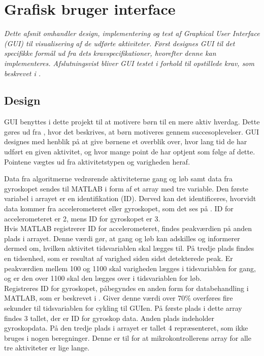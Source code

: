 \section{Grafisk bruger interface}\label{GUI_design}
\textit{Dette afsnit omhandler design, implementering og test af Graphical User Interface (GUI) til visualisering af de udførte aktiviteter. Først designes GUI til det specifikke formål ud fra dets kravspecifikationer, hvorefter denne kan implementeres. Afslutningsvist bliver GUI testet i forhold til opstillede krav, som beskrevet i .}

\subsection{Design}
GUI benyttes i dette projekt til at motivere børn til en mere aktiv hverdag. Dette gøres ud fra , hvor det beskrives, at børn motiveres gennem succesoplevelser. GUI designes med henblik på at give børnene et overblik over, hvor lang tid de har udført en given aktivitet, og hvor mange point de har optjent som følge af dette. Pointene vægtes ud fra aktivitetstypen og varigheden heraf. 

Data fra algoritmerne vedrørende aktiviteterne gang og løb samt data fra gyroskopet sendes til MATLAB i form af et array med tre variable. Den første variabel i arrayet er en identifikation (ID). Derved kan det identificeres, hvorvidt data kommer fra accelerometeret eller gyroskopet, som det ses på . ID for accelerometeret er 2, mens ID for gyroskopet er 3.\\
Hvis MATLAB registrerer ID for accelerometeret, findes peakværdien på anden plads i arrayet. Denne værdi gør, at gang og løb kan adskilles og informerer dermed om, hvilken aktivitet tidsvariablen skal lægges til. På tredje plads findes en tidsenhed, som er resultat af varighed siden sidst detekterede peak. Er peakværdien mellem 100 og 1100 skal varigheden lægges i tidsvariablen for gang, og er den over 1100 skal den lægges over i tidsvariablen for løb.\\
Registreres ID for gyroskopet, påbegyndes en anden form for databehandling i MATLAB, som er beskrevet i . Giver denne værdi over 70\% overføres fire sekunder til tidsvariablen for cykling til GUIen. På første plads i dette array findes 3 tallet, der er ID for gyroskop data. Anden plads indeholder gyroskopdata. På den tredje plads i arrayet er tallet 4 repræsenteret, som ikke bruges i nogen beregninger. Denne er til for at mikrokontrollerens array for alle tre aktiviteter er lige lange. 

